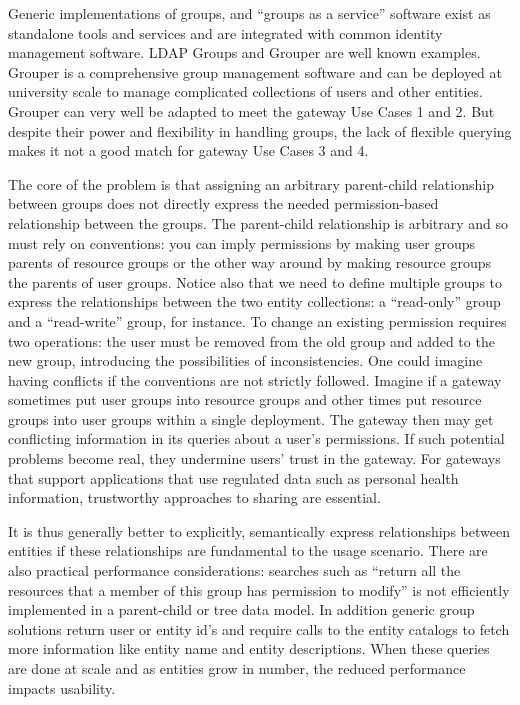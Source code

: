 \documentclass[sigconf]{acmart}
\begin{document}
Generic implementations of groups, and “groups as a service” software exist as standalone tools and services and are integrated with common identity management software. LDAP Groups \cite{aclLDAP} and Grouper \cite{grouperWebsite} are well known examples. Grouper is a comprehensive group management software and can be deployed at university scale to manage complicated collections of users and other entities. Grouper can very well be adapted to meet the gateway Use Cases 1 and 2. But despite their power and flexibility in handling groups, the lack of flexible querying makes it not a good match for gateway Use Cases 3 and 4.

The core of the problem is that assigning an arbitrary parent-child relationship between groups does not directly express the needed permission-based relationship between the groups.  The parent-child relationship is arbitrary and so must rely on conventions: you can imply permissions by making user groups parents of resource groups or the other way around by making resource groups the parents of user groups. Notice also that we need to define multiple groups to express the relationships between the two entity collections: a “read-only” group and a “read-write” group, for instance. To change an existing permission requires two operations: the user must be removed from the old group and added to the new group, introducing the possibilities of inconsistencies. One could imagine having conflicts if the conventions are not strictly followed. Imagine if a gateway sometimes put user groups into resource groups and other times put resource groups into user groups within a single deployment. The gateway then may get conflicting information in its queries about a user’s permissions. If such potential problems become real, they undermine users’ trust in the gateway. For gateways that support applications that use regulated data such as personal health information, trustworthy approaches to sharing are essential.

It is thus generally better to explicitly, semantically express relationships between entities if these relationships are fundamental to the usage scenario. There are also practical performance considerations: searches such as “return all the resources that a member of this group has permission to modify” is not efficiently implemented in a parent-child or tree data model. In addition generic group solutions return user or entity id’s and require calls to the entity catalogs to fetch more information like entity name and entity descriptions. When these queries are done at scale and as entities grow in number, the reduced performance impacts usability.
\end{document}
